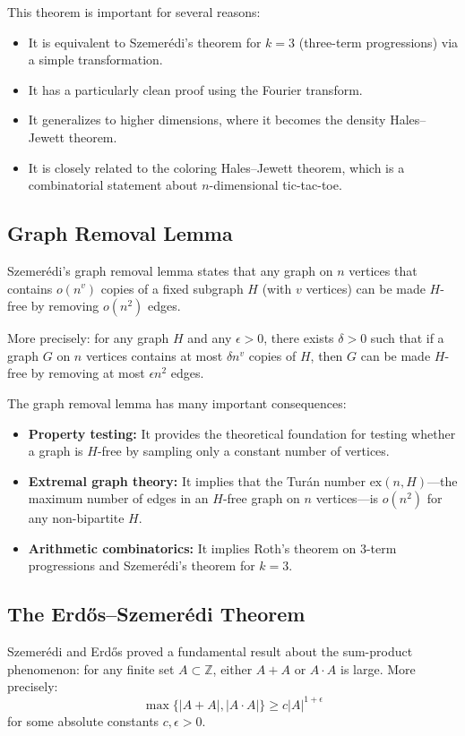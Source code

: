 This theorem is important for several reasons:
\begin{itemize}
\item It is equivalent to Szemer\'edi's theorem for $k=3$ (three-term progressions) via a simple transformation.
\item It has a particularly clean proof using the Fourier transform.
\item It generalizes to higher dimensions, where it becomes the density Hales--Jewett theorem.
\item It is closely related to the coloring Hales--Jewett theorem, which is a combinatorial statement about $n$-dimensional tic-tac-toe.
\end{itemize}

\subsection{Graph Removal Lemma}

Szemer\'edi's graph removal lemma states that any graph on $n$ vertices that contains $o(n^v)$ copies of a fixed subgraph $H$ (with $v$ vertices) can be made $H$-free by removing $o(n^2)$ edges.

More precisely: for any graph $H$ and any $\epsilon > 0$, there exists $\delta > 0$ such that if a graph $G$ on $n$ vertices contains at most $\delta n^v$ copies of $H$, then $G$ can be made $H$-free by removing at most $\epsilon n^2$ edges.

The graph removal lemma has many important consequences:
\begin{itemize}
\item \textbf{Property testing:} It provides the theoretical foundation for testing whether a graph is $H$-free by sampling only a constant number of vertices.
\item \textbf{Extremal graph theory:} It implies that the Tur\'an number $\text{ex}(n, H)$---the maximum number of edges in an $H$-free graph on $n$ vertices---is $o(n^2)$ for any non-bipartite $H$.
\item \textbf{Arithmetic combinatorics:} It implies Roth's theorem on 3-term progressions and Szemer\'edi's theorem for $k=3$.
\end{itemize}

\subsection{The Erd\H{o}s--Szemer\'edi Theorem}

Szemer\'edi and Erd\H{o}s proved a fundamental result about the sum-product phenomenon: for any finite set $A \subset \mathbb{Z}$, either $A+A$ or $A \cdot A$ is large. More precisely:
\[
\max\{|A+A|, |A\cdot A|\} \geq c|A|^{1+\epsilon}
\]
for some absolute constants $c, \epsilon > 0$.

